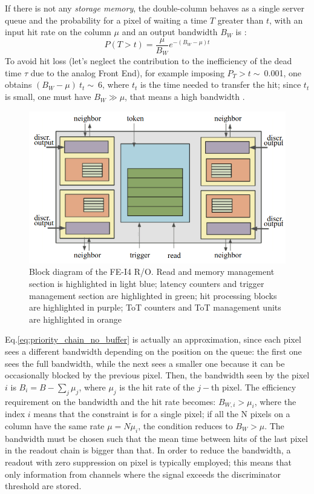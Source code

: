    If there is not any \textit{storage memory}, the double-column behaves as a single server queue and the probability for a pixel of waiting a time $T$ greater than $t$, with an input hit rate on the column $\mu$ and an output bandwidth $B_W$ is \cite{Garcia-Review}:
   \begin{equation}
   P(T > t) = \frac{\mu}{B_W} e^{-( B_W-\mu )t}
   \label{eq:priority_chain_no_buffer}
   \end{equation}
   To avoid hit loss (let's neglect the contribution to the inefficiency of the dead time $\tau$ due to the analog Front End), for example imposing $P_T > t\sim\:$0.001, one obtains $(B_W -\mu)\:t_t\sim\:$6, where $t_t$ is the time needed to transfer the hit; since $t_t$ is small, one must have $B_W \gg \mu$, that means a high bandwidth \cite{Garcia-Review}.
   \begin{figure}[h!]
      \centering
      \includegraphics[width=.7\linewidth]{figures/Pixel_detectors/core.png}
      \caption{Block diagram of the FE-I4 R/O. Read and memory
      management section is highlighted in light blue; latency counters and
      trigger management section are highlighted in green; hit processing blocks
      are highlighted in purple; ToT counters and ToT management units are
      highlighted in orange}
      \label{fig:core}
   \end{figure}

   Eq.\ref{eq:priority_chain_no_buffer} is actually an approximation, since each pixel sees a different bandwidth depending on the position on the queue: the first one sees the full bandwidth, while the next sees a smaller one because it can be occasionally blocked by the previous pixel. Then, the bandwidth seen by the pixel $i$ is $B_{i} = B - \sum _{j}\mu_{j}$, where $\mu_j$ is the hit rate of the $j-$th pixel.
   The efficiency requirement on the bandwidth and the hit rate becomes: $B_{W,i} > \mu_{i}$, where the index $i$ means that the constraint is for a single pixel; if all the N pixels on a column have the same rate $\mu = N\mu_{i}$, the condition reduces to $B_{W} > \mu$.
   The bandwidth must be chosen such that the mean time between hits of the last pixel in the readout chain is bigger than that.
   In order to reduce the bandwidth, a readout with zero suppression on pixel is typically employed; this means that only information from channels where the signal exceeds the discriminator threshold are stored. 

